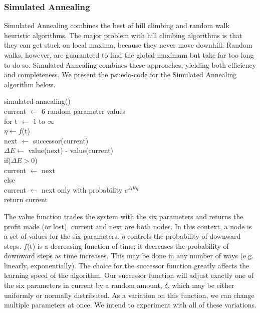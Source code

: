 \documentclass[10pt]{article}
\begin{document}
\subsubsection{Simulated Annealing}
Simulated Annealing combines the best of hill climbing and random walk heuristic
algorithms.  The major problem with hill climbing algorithms is that they can
get stuck on local maxima, because they never move downhill.
Random walks, however, are guaranteed to find the global maximum but take far
too long to do so.  Simulated Annealing combines these approaches, yielding both
efficiency and completeness.  We present the psuedo-code for the Simulated
Annealing algorithm below.

\setlength{\parindent}{5mm}
\indent simulated-annealing()\\
\indent \indent current $\leftarrow$ 6 random parameter values\\
\indent \indent for t $\leftarrow$ 1 to $\infty$\\
\indent \indent \indent $\eta \leftarrow f$(t)\\
\indent \indent \indent next $\leftarrow$ successor(current)\\
\indent \indent \indent $\Delta E \leftarrow$ value(next) - value(current)\\
\indent \indent \indent if($\Delta E > 0$)\\
\indent \indent \indent \indent current $\leftarrow$ next\\
\indent \indent \indent else\\
\indent \indent \indent \indent current $\leftarrow$ next only with probability $e^{\Delta E\eta}$\\
\indent \indent return current\\
\setlength{\parindent}{0mm}

The value function trades the system with the six parameters and returns the
profit made (or lost).  current and next are both nodes.  In this context, a
node is a set of values for the six parameters.  $\eta$ controls the probability
of downward steps.  $f$(t) is a decreasing function of time; it decreases the
probability of downward steps as time increases.  This may be done in any number
of ways (e.g. linearly, exponentially).  The choice for the successor function
greatly affects the learning speed of the algorithm.  Our successor function
will adjust exactly one of the six parameters in current by a random amount,
$\delta$, which may be either uniformly or normally distributed.  As a variation
on this function, we can change multiple parameters at once.  We intend to
experiment with all of these variations.
\end{document}

